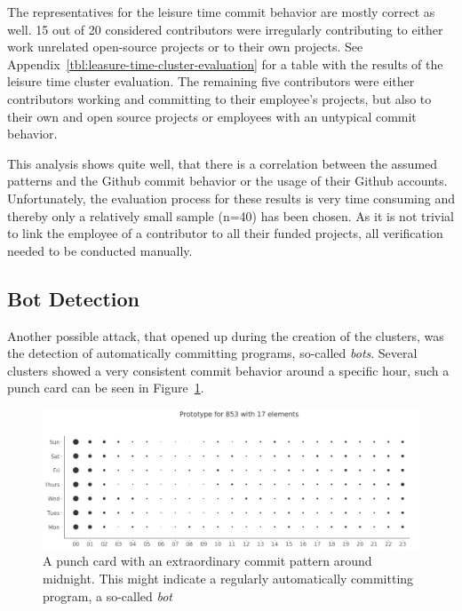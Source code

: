 

The representatives for the leisure time commit behavior are mostly correct as well.
15 out of 20 considered contributors were irregularly contributing to either work unrelated open-source projects or to their own projects.
See Appendix~\ref{tbl:leasure-time-cluster-evaluation} for a table with the results of the leisure time cluster evaluation.
The remaining five contributors were either contributors working and committing to their employee's projects, but also to their own and open source projects or employees with an untypical commit behavior.

This analysis shows quite well, that there is a correlation between the assumed patterns and the Github commit behavior or the usage of their Github accounts.
Unfortunately, the evaluation process for these results is very time consuming and thereby only a relatively small sample (n=40) has been chosen.
As it is not trivial to link the employee of a contributor to all their funded projects, all verification needed to be conducted manually.


\subsection{Bot Detection}
Another possible attack, that opened up during the creation of the clusters, was the detection of automatically committing programs, so-called \emph{bots}.
Several clusters showed a very consistent commit behavior around a specific hour, such a punch card can be seen in Figure~\ref{fig:bot-punchcard}.

\begin{figure}[H]
    \includegraphics[scale=0.32]{./graphs/analysis/bot-punchcard}
    \centering
    \caption{A punch card with an extraordinary commit pattern around midnight. This might indicate a regularly automatically committing program, a so-called \emph{bot}}\label{fig:bot-punchcard}
\end{figure}

